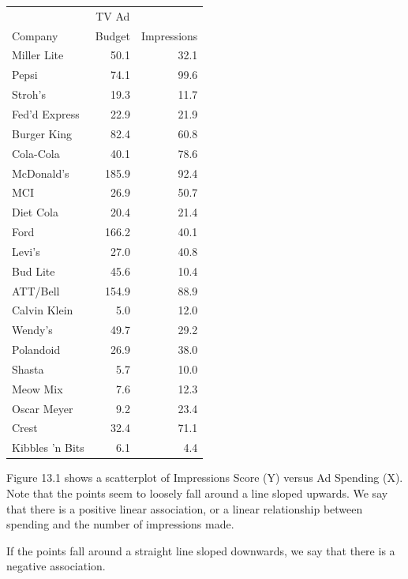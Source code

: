 \documentclass[11pt, chapterprefix=true]{scrbook}\usepackage[]{graphicx}\usepackage[]{color}
\begin{document}
\begin{table}[ht]
\centering 
\begin{tabular}{@{} lrr @{}} \hline
& \multicolumn{1}{c}{TV Ad} \\
Company & Budget & Impressions \\ \hline
Miller Lite & 50.1 & 32.1 \\
Pepsi & 74.1 & 99.6 \\
Stroh's & 19.3 & 11.7 \\
Fed'd Express & 22.9 & 21.9 \\
Burger King & 82.4 & 60.8 \\
Cola-Cola & 40.1 & 78.6 \\
McDonald's & 185.9 & 92.4 \\
MCI & 26.9 & 50.7 \\
Diet Cola & 20.4 & 21.4 \\
Ford & 166.2 & 40.1 \\
Levi's & 27.0 & 40.8 \\
Bud Lite & 45.6 & 10.4 \\
ATT/Bell & 154.9 & 88.9 \\
Calvin Klein & 5.0 & 12.0 \\
Wendy's & 49.7 & 29.2 \\
Polandoid & 26.9 & 38.0 \\
Shasta & 5.7 & 10.0 \\
Meow Mix & 7.6 & 12.3 \\
Oscar Meyer & 9.2 & 23.4 \\
Crest & 32.4 & 71.1 \\
Kibbles 'n Bits & 6.1 & 4.4 \\ \hline
\end{tabular}
\end{table}

Figure 13.1 shows a scatterplot of Impressions Score (Y) versus Ad Spending (X). Note that the points seem to loosely fall around a line sloped upwards.  We say that there is a positive linear association, or a linear relationship between spending and the number of impressions made.  

If the points fall around a straight line sloped downwards, we say that there is a negative association.
\end{document}
